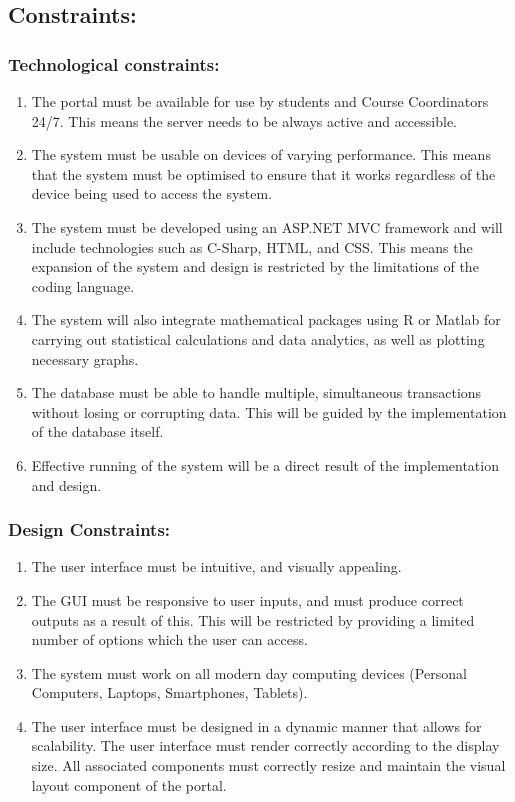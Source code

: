\documentclass[paper=a4, fontsize=11pt]{scrartcl}
\numberwithin{equation}{section}		%
\numberwithin{figure}{section}			%
\numberwithin{table}{section}				%
\begin{document}
\subsection{Constraints:}
\subsubsection{Technological constraints:}
\begin{enumerate}
	\item The portal must be available for use by students and Course Coordinators 24/7. This
	means the server needs to be always active and accessible. 
	\item The system must be usable on devices of varying performance. This means that the
	system must be optimised to ensure that it works regardless of the device being used
	to access the system. 
	\item The system must be developed using an ASP.NET MVC framework and will include
	technologies such as C-Sharp, HTML, and CSS. This means the expansion of the system
	and design is restricted by the limitations of the coding language.
	\item The system will also integrate mathematical packages using R or Matlab for carrying
	out statistical calculations and data analytics, as well as plotting necessary graphs.
	\item The database must be able to handle multiple, simultaneous transactions without
	losing or corrupting data. This will be guided by the implementation of the database
	itself.
	\item Effective running of the system will be a direct result of the implementation and
	design.
\end{enumerate}

\subsubsection{Design Constraints:}
\begin{enumerate}
\item The user interface must be intuitive, and visually appealing.
\item The GUI must be responsive to user inputs, and must produce correct outputs as a
result of this. This will be restricted by providing a limited number of options which the
user can access.
\item The system must work on all modern day computing devices (Personal Computers,
Laptops, Smartphones, Tablets).
\item The user interface must be designed in a dynamic manner that allows for scalability.
The user interface must render correctly according to the display size. All associated
components must correctly resize and maintain the visual layout component of the
portal.
\end{enumerate}
\end{document}
